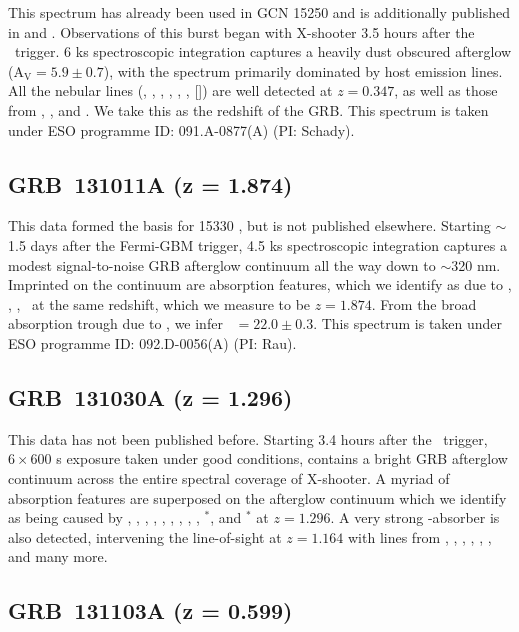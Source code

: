 \documentclass{aa}    %
\begin{document}
This spectrum has already been used in GCN 15250 \citep{GCN15250} and is
additionally published in \citet{Schady2015} and \citet{Kruhler2015}.
Observations of this burst began with X-shooter 3.5 hours after the
\swift~trigger. 6 ks spectroscopic integration captures a heavily dust obscured
afterglow (A$_\mathrm{V} = 5.9 \pm 0.7$\citep{Greiner2014}), with the spectrum
primarily dominated by host emission lines. All the nebular lines (\oii, \hg,
\hb, \oii, \ha, \nii, [\sii]) are well detected at $z = 0.347$, as well as those
from \pad, \pag, and \pab. We take this as the redshift of the GRB. This
spectrum is taken under ESO programme ID: 091.A-0877(A) (PI: Schady).

\subsection{GRB~131011A (z = 1.874)}\label{131011}

This data formed the basis for 15330 \citep{GCN15330}, but is not published
elsewhere. Starting $\sim$1.5 days after the Fermi-GBM trigger, 4.5 ks
spectroscopic integration captures a modest signal-to-noise GRB afterglow
continuum all the way down to $\sim$320 nm. Imprinted on the continuum are
absorption features, which we identify as due to \lya, \feii,  \mgii, \mgi~at
the same redshift, which we measure to be $z = 1.874$. From the broad absorption
trough due to \lya, we infer \nh~$= 22.0 \pm 0.3$. This spectrum is taken under
ESO programme ID: 092.D-0056(A) (PI: Rau).

\subsection{GRB~131030A (z = 1.296)}	
\label{131030}

This data has not been published before. Starting 3.4 hours after the
\swift~trigger, $6\times600$ s exposure taken under good conditions, contains a
bright GRB afterglow continuum across the entire spectral coverage of X-shooter.
A myriad of absorption features are superposed on the afterglow continuum which
we identify as being caused by \SIiv, \SIii, \civ, \alii, \aliii, \znii, \crii,
\NIii, \feii, \NIii$^*$, and \feii$^*$ at $z = 1.296$. A very strong
\mgii-absorber is also detected, intervening the line-of-sight at $z = 1.164$
with lines from \SIii, \civ, \aliii, \aliii, \feii, \mnii, and many more.

\subsection{GRB~131103A (z = 0.599)}\label{131103}
\end{document}
